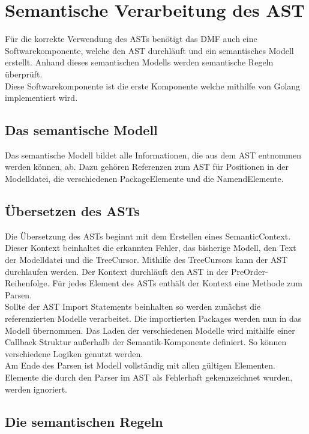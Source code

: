 \documentclass[./einleitung.tex]{subfiles}
\begin{document}
    \section{Semantische Verarbeitung des AST}\label{sec:semantische-verarbeitung-des-ast}
    Für die korrekte Verwendung des ASTs benötigt das DMF auch eine Softwarekomponente,
    welche den AST durchläuft und ein semantisches Modell erstellt.
    Anhand dieses semantischen Modells werden semantische Regeln überprüft. \\

    Diese Softwarekomponente ist die erste Komponente welche mithilfe von Golang implementiert wird.

    \subsection{Das semantische Modell}\label{subsec:das-semantische-modell}
    Das semantische Modell bildet alle Informationen, die aus dem AST entnommen werden können, ab.
    Dazu gehören Referenzen zum AST für Positionen in der Modelldatei, die verschiedenen PackageElemente und die NamendElemente.

    \subsection{Übersetzen des ASTs}\label{subsec:ubersetzen-des-asts}
    Die Übersetzung des ASTs beginnt mit dem Erstellen eines SemanticContext.
    Dieser Kontext beinhaltet die erkannten Fehler, das bisherige Modell, den Text der Modelldatei und die TreeCursor.
    Mithilfe des TreeCursors kann der AST durchlaufen werden.
    Der Kontext durchläuft den AST in der PreOrder-Reihenfolge.
    Für jedes Element des ASTs enthält der Kontext eine Methode zum Parsen.\\
    Sollte der AST Import Statements beinhalten so werden zunächst die referenzierten Modelle verarbeitet.
    Die importierten Packages werden nun in das Modell übernommen.
    Das Laden der verschiedenen Modelle wird mithilfe einer Callback Struktur außerhalb der Semantik-Komponente definiert.
    So können verschiedene Logiken genutzt werden. \\
    Am Ende des Parsen ist Modell vollständig mit allen gültigen Elementen.
    Elemente die durch den Parser im AST als Fehlerhaft gekennzeichnet wurden, werden ignoriert.

    \subsection{Die semantischen Regeln}\label{subsec:die-semantischen-regeln}
\end{document}
